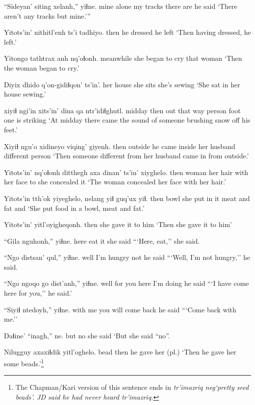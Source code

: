 \documentclass[12pt]{article}
\begin{document}
\gll ``Sideyan' siting  xelanh,'' yiɬne.
{mine alone} {my tracks} {there are} {he said}
\glt `There aren't any tracks but mine.'''
\glend

\gll Yitots'in' nithitl'enh ts'i tadhiyo.
then {he dressed} {} {he left}
\glt `Then having dressed, he left.'
\glend

\gll Yitongo tathtrax  anh nq'oɬonh.
meanwhile {she began to cry} that woman
\glt `Then the woman began to cry.'
\glend

\gll Diyix  dhido  q'on-gidiɬqon' ts'in'.
{her house} {she sits} {she's sewing} {}
\glt `She sat in her house sewing.'
\glend

 xiyiɬ ngi'in xits'in' dina qa  ntr'idiɬghutl.
midday then out {that way} person foot {one is striking}
\glt `At midday there came the sound of someone brushing snow off his feet.'
\glend

\gll Xiyiɬ ngu'o  xidineyo viqing'  giyenh.
then outside  {he came inside} {her husband} {different person}
\glt `Then someone different from her husband came in from outside.'
\glend

\gll Yitots'in' nq'oɬonh ditthegh axa dinan' ts'in' xiyghelo.
then  woman  {her hair} with {her face} to {she concealed it}
\glt `The woman concealed her face with her hair.'
\glend

\gll Yitots'in tth'ok yiyeghelo, nelang yiɬ guq'ux yiɬ. 
then  bowl  {she put in it} meat  and fat  and
\glt `She put food in a bowl, meat and fat.'
\glend

\gll Yitots'in' yitl'oyigheqonh.
then  {she gave it to him}
\glt `Then she gave it to him'
\glend

\gll ``Gila nguhonh,'' yiɬne.
here {eat it} {she said}
\glt ```Here, eat,'' she said.
\glend

\gll ``Ngo distsan' qul,'' yiɬne.
well {I'm hungry} not {he said}
\glt ```Well, I'm not hungry,'' he said.
\glend

\gll ``Ngo ngoqo  go dist'anh,'' yiɬne.
well {for you}  here {I'm doing} {he said}
\glt ```I have come here for you,'' he said.'
\glend

\gll ``Siyiɬ  ntedoyh,'' yiɬne.
{with me} {you will come back} {he said}
\glt ```Come back with me.''
\glend

\gll Daɬine' ``inagh,'' ne.
but  no {she said}
\glt `But she said ``no''.
\glend

\gll Nilugguy axaxiɬdik yitl'oghelo.
bead  then  {he gave her (pl.)} 
\glt `Then he gave her some beads.'\footnote{The Chapman/Kari version of this sentence ends in \em tr'imazriq neg\em `pretty seed beads'. JD said he had never heard \em tr'imazriq.}
\glend
\end{document}
